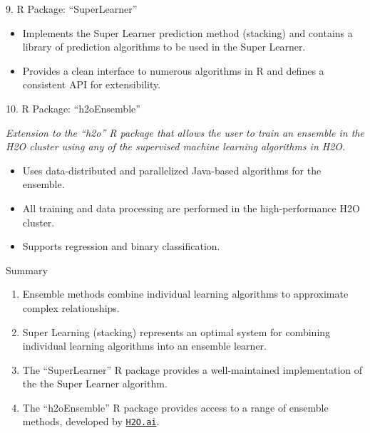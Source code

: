 \documentclass[12pt,t]{beamer}
\begin{document}
\begin{frame}[c]{9. R Package: ``SuperLearner''}

\vspace*{3mm}

\centering

  \begin{itemize}
    \itemsep12pt
    \item Implements the Super Learner prediction method (stacking) and
          contains a library of prediction algorithms to be used in the Super
          Learner.
    \item Provides a clean interface to numerous algorithms in R and defines a
          consistent API for extensibility.
  \end{itemize}

\note{
}
\end{frame}


\begin{frame}{10. R Package: ``h2oEnsemble''}

\vspace*{3mm}

\centering

\textit{Extension to the ``h2o'' R package that allows the user to train an
ensemble in the H2O cluster using any of the supervised machine learning
algorithms in H2O.}

\vspace{1em}

  \begin{itemize}
    \itemsep12pt
    \item Uses data-distributed and parallelized Java-based algorithms for the
          ensemble.
    \item All training and data processing are performed in the
          high-performance H2O cluster.
    \item Supports regression and binary classification.
  \end{itemize}

\note{
}
\end{frame}


\begin{frame}[c]{Summary}

  \begin{enumerate}
  \itemsep12pt
    \item Ensemble methods combine individual learning algorithms to approximate
          complex relationships.
    \item Super Learning (stacking) represents an optimal system for combining
          individual learning algorithms into an ensemble learner.
    \item The ``SuperLearner'' R package provides a well-maintained
          implementation of the the Super Learner algorithm.
    \item The ``h2oEnsemble'' R package provides access to a range of ensemble
          methods, developed by \href{http://www.h2o.ai}{\tt H2O.ai}.
  \end{enumerate}

\end{frame}
\end{document}
